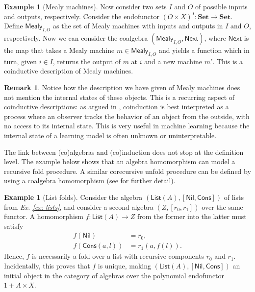 \documentclass[11pt,a4paper,openright,twoside]{report}
\theoremstyle{plain}
\theoremstyle{definition}
\newtheorem{remark}[proposition]{Remark}
\newtheorem{example}[proposition]{Example}
\begin{document}
\begin{example}[Mealy machines]
  \label{ex: mealy}
  Now consider two sets $I$ and $O$ of possible inputs and outputs, respectively. Consider the endofunctor $(O \times X)^I: \mathbf{Set} \to \mathbf{Set}$.  Define $\mathsf{Mealy}_{I,O}$ as the set of Mealy machines with inputs and outputs in $I$ and $O$, respectively. Now we can consider the coalgebra $(\mathsf{Mealy}_{I,O}, \mathsf{Next})$, where $\mathsf{Next}$ is the map that takes a Mealy machine $m \in \mathsf{Mealy}_{I,O}$ and yields a function which in turn, given $i \in I$, returns the output of $m$ at $i$ and a new machine $m'$. This is a coinductive description of Mealy machines.
\end{example}

\begin{remark}
  Notice how the description we have given of Mealy machines does not mention the internal states of these objects. This is a recurring aspect of coinductive descriptions: as argued in \cite{jacobs1997tutorial}, coinduction is best interpreted as a process where an observer tracks the behavior of an object from the outside, with no access to its internal state. This is very useful in machine learning because the internal state of a learning model is often unknown or uninterpretable.
\end{remark}

The link between (co)algebras and (co)induction does not stop at the definition level. The example below shows that an algebra homomorphism can model a recursive fold procedure. A similar corecursive unfold procedure can be defined by using a coalgebra homomorphism (see \cite{gavranovicposition} for further detail).

\begin{example}[List folds]
  \label{ex: listfold}
  Consider the algebra $(\mathsf{List}(A), [\mathsf{Nil}, \mathsf{Cons}])$ of lists from \textit{Ex. \ref{ex: lists}}, and consider a second algebra $(Z, [r_0,r_1])$ over the same functor. A homomorphism $f: \mathsf{List}(A) \to Z$ from the former into the latter must satisfy 
  \begin{align*}
    f(\mathsf{Nil}) &= r_0,\\
    f(\mathsf{Cons}(a,l)) &= r_1(a,f(l)). 
  \end{align*}
  Hence, $f$ is necessarily a fold over a list with recursive components $r_0$ and $r_1$. Incidentally, this proves that $f$ is unique, making $(\mathsf{List}(A), [\mathsf{Nil}, \mathsf{Cons}])$ an initial object in the category of algebras over the polynomial endofunctor $1 + A \times X$.
\end{example}
\end{document}
